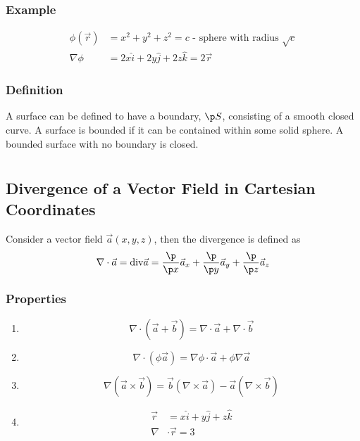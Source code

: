 \documentclass[a4paper, 11pt, normalem]{report}
\begin{document}
\subsection{Example}
\begin{align*}
    \phi(\vec{r}) &= x^2 + y^2 + z^2 = c \text{ - sphere with radius }\sqrt{c} \\
    \nabla\phi &= 2x\hat{i} + 2y\hat{j} + 2z\hat{k} = 2\vec{r}
\end{align*}

\subsection{Definition}
A surface can be defined to have a boundary, $\p S$, consisting of a smooth closed curve.
A surface is bounded if it can be contained within some solid sphere.
A bounded surface with no boundary is closed.

\chapter{}
\section{Divergence of a Vector Field in Cartesian Coordinates}
Consider a vector field $\vec{a}(x,y,z)$, then the divergence is defined as
\begin{equation*}
    \nabla \cdot \vec{a} = \text{div}\vec{a} = \frac{\p}{\p x}\vec{a}_x + \frac{\p}{\p y}\vec{a}_y + \frac{\p}{\p z}\vec{a}_z
\end{equation*}

\subsection{Properties}
\begin{enumerate}
    \item
            \begin{equation*}
                \nabla \cdot (\vec{a} + \vec{b}) = \nabla\cdot\vec{a} + \nabla\cdot\vec{b}
            \end{equation*}
    \item
            \begin{equation*}
                \nabla\cdot(\phi\vec{a}) = \nabla\phi \cdot \vec{a} + \phi\nabla\vec{a}
            \end{equation*}
    \item
            \begin{equation*}
                \nabla (\vec{a} \times \vec{b}) = \vec{b}(\nabla \times \vec{a}) - \vec{a}(\nabla\times\vec{b})
            \end{equation*}
    \item
            \begin{align*}
                \vec{r} &= x\hat{i} + y\hat{j} + z\hat{k} \\
                \nabla &\cdot \vec{r} = 3
            \end{align*}
\end{enumerate}
\end{document}
